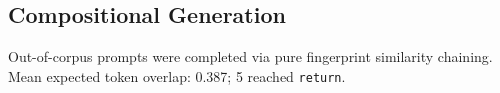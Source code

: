 \subsection{Compositional Generation}
Out-of-corpus prompts were completed via pure fingerprint similarity chaining.
Mean expected token overlap: 0.387; 5 reached \texttt{return}.
